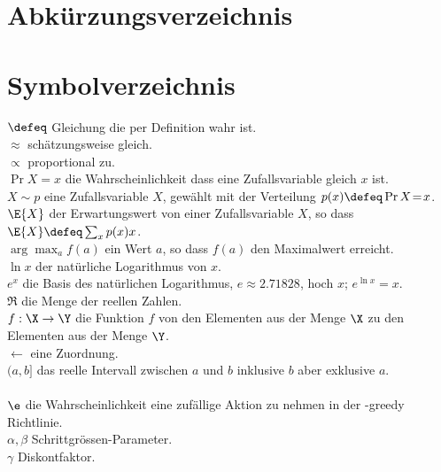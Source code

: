 \documentclass[a4paper,titlepage]{article}
\numberwithin{equation}{section} %
\begin{document}
\newpage

\tableofcontents

\newpage

\listoffigures
\newpage

\listoftables
\newpage

\section*{Abkürzungsverzeichnis}

\newpage

\section*{Symbolverzeichnis}
\>$\defeq$            \> Gleichung die per Definition wahr ist.\\
\>$\approx$           \> schätzungsweise gleich.\\
\>$\propto$           \> proportional zu.\\
\>$\Pr{X\!=\!x}$      \> die Wahrscheinlichkeit dass eine Zufallsvariable gleich $x$ ist.\\
\>$X\sim p$           \> eine Zufallsvariable $X$, gewählt mit der Verteilung $p(x)\defeq\Pr{X\!=\!x}$.\\
\>$\E{X}$             \> der Erwartungswert von einer Zufallsvariable $X$, so dass $\E{X}\defeq\sum_x p(x)x$.\\
\>$\arg\max_a f(a)$   \> ein Wert $a$, so dass $f(a)$ den Maximalwert erreicht.\\
\>$\ln x$             \> der natürliche Logarithmus von $x$.\\
\>$e^x$               \> die Basis des natürlichen Logarithmus, $e\approx 2.71828$, hoch $x$; $e^{\ln x}=x$.\\
\>$\Re$               \> die Menge der reellen Zahlen.\\
\>$f:\X\rightarrow\Y$ \> die Funktion $f$ von den Elementen aus der Menge $\X$ zu den Elementen aus der Menge $\Y$.\\
\>$\leftarrow$        \> eine Zuordnung.\\
\>$(a,b]$             \> das reelle Intervall zwischen $a$ und $b$ inklusive $b$ aber exklusive $a$.\\
\\
\>$\e$                \> die Wahrscheinlichkeit eine zufällige Aktion zu nehmen in der \e-greedy Richtlinie.\\
\>$\alpha, \beta$     \> Schrittgrössen-Parameter.\\
\>$\gamma$            \> Diskontfaktor.\\
\end{document}
